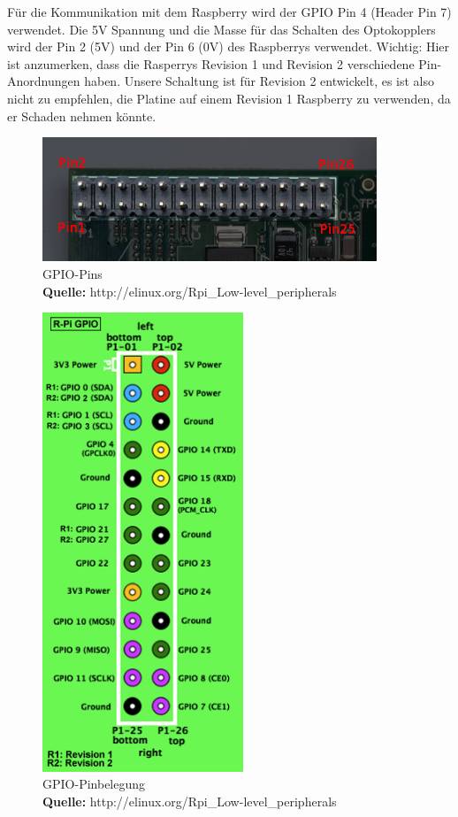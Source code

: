 Für die Kommunikation mit dem Raspberry wird der GPIO Pin 4 (Header Pin 7) verwendet. Die 5V Spannung und die Masse für das Schalten des Optokopplers wird der Pin 2 (5V) und der Pin 6 (0V) des Raspberrys verwendet. Wichtig: Hier ist anzumerken, dass die Rasperrys Revision 1 und Revision 2 verschiedene Pin-Anordnungen haben. Unsere Schaltung ist für Revision 2 entwickelt, es ist also nicht zu empfehlen, die Platine auf einem Revision 1 Raspberry zu verwenden, da er Schaden nehmen könnte.
\\
\begin{figure}[H]
\centering
\includegraphics[keepaspectratio=true, width=10cm]{images/rpi/picPins.png}
\caption[GPIO-Pins]{GPIO-Pins\\ \textbf{Quelle:}  http://elinux.org/Rpi\_Low-level\_peripherals}
\label{fig:report_hardware_gpio1}
\end{figure}
\begin{figure}[H]
\centering
\includegraphics[keepaspectratio=true, width=6cm]{images/rpi/gpio.png}
\caption[GPIO-Pinbelegung]{GPIO-Pinbelegung\\ \textbf{Quelle:} http://elinux.org/Rpi\_Low-level\_peripherals}
\label{fig:report_hardware_gpio2} 
\end{figure}
